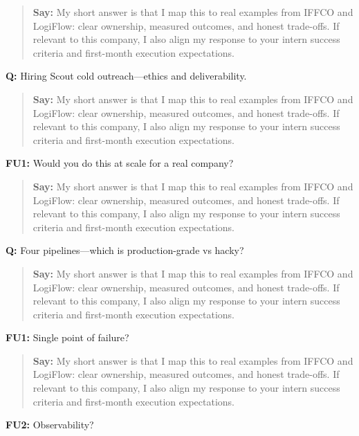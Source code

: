 \documentclass[9pt,a4paper]{article}
\begin{document}
\begin{quote}\small\textbf{Say:} My short answer is that I map this to real examples from IFFCO and LogiFlow: clear ownership, measured outcomes, and honest trade-offs. If relevant to this company, I also align my response to your intern success criteria and first-month execution expectations.\end{quote}
\vspace{2mm}
\textbf{Q:} Hiring Scout cold outreach---ethics and deliverability.

\begin{quote}\small\textbf{Say:} My short answer is that I map this to real examples from IFFCO and LogiFlow: clear ownership, measured outcomes, and honest trade-offs. If relevant to this company, I also align my response to your intern success criteria and first-month execution expectations.\end{quote}
\vspace{2mm}
\textbf{FU1:} Would you do this at scale for a real company?

\begin{quote}\small\textbf{Say:} My short answer is that I map this to real examples from IFFCO and LogiFlow: clear ownership, measured outcomes, and honest trade-offs. If relevant to this company, I also align my response to your intern success criteria and first-month execution expectations.\end{quote}
\vspace{2mm}
\textbf{Q:} Four pipelines---which is production-grade vs hacky?

\begin{quote}\small\textbf{Say:} My short answer is that I map this to real examples from IFFCO and LogiFlow: clear ownership, measured outcomes, and honest trade-offs. If relevant to this company, I also align my response to your intern success criteria and first-month execution expectations.\end{quote}
\vspace{2mm}
\textbf{FU1:} Single point of failure?

\begin{quote}\small\textbf{Say:} My short answer is that I map this to real examples from IFFCO and LogiFlow: clear ownership, measured outcomes, and honest trade-offs. If relevant to this company, I also align my response to your intern success criteria and first-month execution expectations.\end{quote}
\vspace{2mm}
\textbf{FU2:} Observability?
\end{document}
